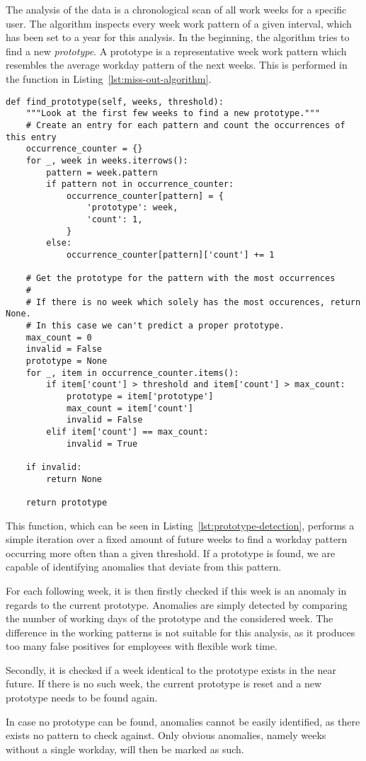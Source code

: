 The analysis of the data is a chronological scan of all work weeks for a specific user.
The algorithm inspects every week work pattern of a given interval, which has been set to a year for this analysis.
In the beginning, the algorithm tries to find a new \emph{prototype}.
A prototype is a representative week work pattern which resembles the average workday pattern of the next weeks.
This is performed in the function  in Listing~\ref{lst:miss-out-algorithm}.


\begin{verbatim}
def find_prototype(self, weeks, threshold):
    """Look at the first few weeks to find a new prototype."""
    # Create an entry for each pattern and count the occurrences of this entry
    occurrence_counter = {}
    for _, week in weeks.iterrows():
        pattern = week.pattern
        if pattern not in occurrence_counter:
            occurrence_counter[pattern] = {
                'prototype': week,
                'count': 1,
            }
        else:
            occurrence_counter[pattern]['count'] += 1

    # Get the prototype for the pattern with the most occurrences
    #
    # If there is no week which solely has the most occurences, return None.
    # In this case we can't predict a proper prototype.
    max_count = 0
    invalid = False
    prototype = None
    for _, item in occurrence_counter.items():
        if item['count'] > threshold and item['count'] > max_count:
            prototype = item['prototype']
            max_count = item['count']
            invalid = False
        elif item['count'] == max_count:
            invalid = True

    if invalid:
        return None

    return prototype
\end{verbatim}
\begingroup
{}\label{lst:prototype-detection}
\endgroup

This function, which can be seen in Listing~\ref{lst:prototype-detection}, performs a simple iteration over a fixed amount of future weeks to find a workday pattern occurring more often than a given threshold.
If a prototype is found, we are capable of identifying anomalies that deviate from this pattern.

For each following week, it is then firstly checked if this week is an anomaly in regards to the current prototype.
Anomalies are simply detected by comparing the number of working days of the prototype and the considered week.
The difference in the working patterns is not suitable for this analysis, as it produces too many false positives for employees with flexible work time.

Secondly, it is checked if a week identical to the prototype exists in the near future.
If there is no such week, the current prototype is reset and a new prototype needs to be found again.

In case no prototype can be found, anomalies cannot be easily identified, as there exists no pattern to check against.
Only obvious anomalies, namely weeks without a single workday, will then be marked as such.

